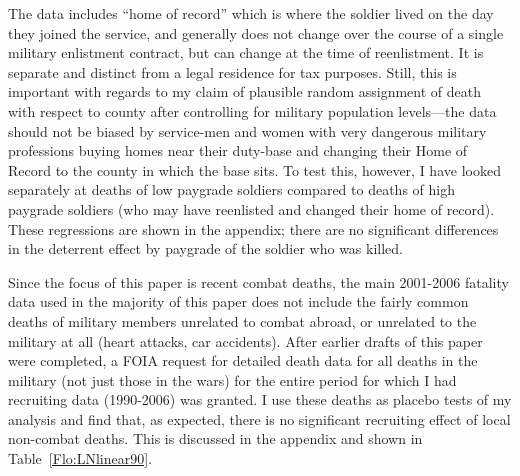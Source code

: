 \documentclass[12pt] {article}
\begin{document}
The data includes {}``home of record'' which is where the soldier lived on the day they joined the service, and generally does not change over the course of a single military enlistment contract, but can change at the time of reenlistment. It is separate and distinct from a legal residence for tax purposes. Still, this is important with regards to my claim of plausible random assignment of death with respect to county after controlling for military population levels---the data should not be biased by service-men and women with very dangerous military professions buying homes near their duty-base and changing their Home of Record to the county in which the base sits. To test this, however, I have looked separately at deaths of low paygrade soldiers compared to deaths of high paygrade soldiers (who may have reenlisted and changed their home of record). These regressions are shown in the appendix; there are no significant differences in the deterrent effect by paygrade of the soldier who was killed. 

Since the focus of this paper is recent combat deaths, the main 2001-2006 fatality data used in the majority of this paper does not include the fairly common deaths of military members unrelated to combat abroad, or unrelated to the military at all (heart attacks, car accidents).  After earlier drafts of this paper were completed, a FOIA request for detailed death data for all  deaths in the military (not just those in the wars) for the entire period for which I had recruiting data (1990-2006) was granted. I use these deaths as placebo tests of my analysis and find that, as expected, there is no significant recruiting effect of local non-combat deaths. This is discussed in the appendix and shown in Table~\ref{Flo:LNlinear90}.
\end{document}
